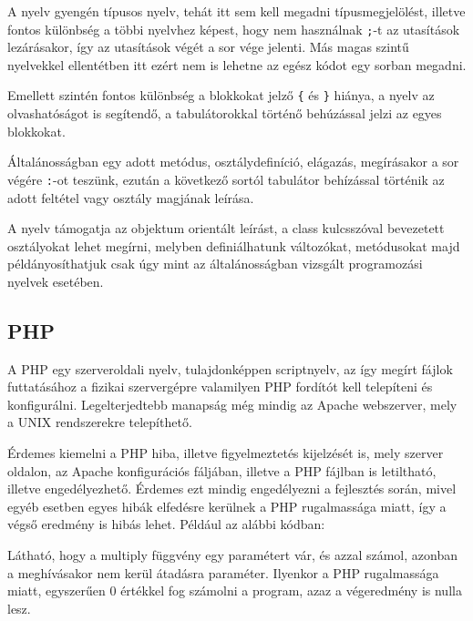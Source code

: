 A nyelv gyengén típusos nyelv, tehát itt sem kell megadni típusmegjelölést, illetve fontos különbség a többi nyelvhez képest, hogy nem használnak \texttt{;}-t az utasítások lezárásakor, így az utasítások végét a sor vége jelenti. Más magas szintű nyelvekkel ellentétben itt ezért nem is lehetne az egész kódot egy sorban megadni.

Emellett szintén fontos különbség a blokkokat jelző \texttt{\{} és \texttt{\}} hiánya, a nyelv az olvashatóságot is segítendő, a tabulátorokkal történő behúzással jelzi az egyes blokkokat.

Általánosságban egy adott metódus, osztálydefiníció, elágazás, megírásakor a sor végére \texttt{:}-ot teszünk, ezután a következő sortól tabulátor behízással történik az adott feltétel vagy osztály magjának leírása.

A nyelv támogatja az objektum orientált leírást, a class kulcsszóval bevezetett osztályokat lehet megírni, melyben definiálhatunk változókat, metódusokat majd példányosíthatjuk csak úgy mint az általánosságban vizsgált programozási nyelvek esetében.

\subsection{PHP}

A PHP egy szerveroldali nyelv, tulajdonképpen scriptnyelv, az így megírt fájlok futtatásához a fizikai szervergépre valamilyen PHP fordítót kell telepíteni és konfigurálni. Legelterjedtebb manapság még mindig az Apache webszerver, mely a UNIX rendszerekre telepíthető.

Érdemes kiemelni a PHP hiba, illetve figyelmeztetés kijelzését is, mely szerver oldalon, az Apache konfigurációs fáljában, illetve a PHP fájlban is letiltható, illetve engedélyezhető. Érdemes ezt mindig engedélyezni a fejlesztés során, mivel egyéb esetben egyes hibák elfedésre kerülnek a PHP rugalmassága miatt, így a végső eredmény is hibás lehet. Például az alábbi kódban:


Látható, hogy a multiply függvény egy paramétert vár, és azzal számol, azonban a meghívásakor nem kerül átadásra paraméter. Ilyenkor a PHP rugalmassága miatt, egyszerűen 0 értékkel fog számolni a program, azaz a végeredmény is nulla lesz.

